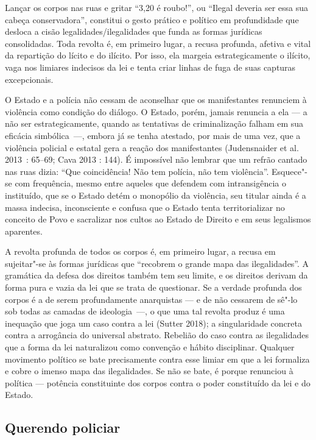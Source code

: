 Lançar os corpos nas ruas e gritar ``3,20 é roubo!'', ou ``Ilegal
deveria ser essa sua cabeça conservadora'', constitui o gesto prático e
político em profundidade que desloca a cisão legalidades/ilegalidades
que funda as formas jurídicas consolidadas. Toda revolta é, em primeiro
lugar, a recusa profunda, afetiva e vital da repartição do lícito e do
ilícito. Por isso, ela margeia estrategicamente o ilícito, vaga nos
limiares indecisos da lei e tenta criar linhas de fuga de suas capturas
excepcionais.

O Estado e a polícia não cessam de aconselhar que os manifestantes
renunciem à violência como condição do diálogo. O Estado, porém, jamais
renuncia a ela --- a não ser estrategicamente, quando as tentativas de
criminalização falham em sua eficácia simbólica~---, embora já se tenha
atestado, por mais de uma vez, que a violência policial e estatal gera a
reação dos manifestantes (Judensnaider et al. 2013~: 65--69; Cava 2013 :
144). É impossível não lembrar que um refrão cantado nas ruas dizia:
``Que coincidência! Não tem polícia, não tem violência''. Esquece"-se com
frequência, mesmo entre aqueles que defendem com intransigência o
instituído, que se o Estado detém o monopólio da violência, seu titular
ainda é a massa indecisa, inconsciente e confusa que o Estado tenta
territorializar no conceito de Povo e sacralizar nos cultos ao Estado de
Direito e em seus legalismos aparentes.

A revolta profunda de todos os corpos é, em primeiro lugar, a recusa em
sujeitar"-se às formas jurídicas que ``recobrem o grande mapa das
ilegalidades''. A gramática da defesa dos direitos também tem seu
limite, e os direitos derivam da forma pura e vazia da lei que se trata
de questionar. Se a verdade profunda dos corpos é a de serem
profundamente anarquistas --- e de não cessarem de sê"-lo sob todas as
camadas de ideologia~---, o que uma tal revolta produz é uma inequação
que joga um caso contra a lei (Sutter 2018); a singularidade concreta
contra a arrogância do universal abstrato. Rebelião do caso contra as
ilegalidades que a forma da lei naturalizou como convenção e hábito
disciplinar. Qualquer movimento político se bate precisamente contra
esse limiar em que a lei formaliza e cobre o imenso mapa das
ilegalidades. Se não se bate, é porque renunciou à política --- potência
constituinte dos corpos contra o poder constituído da lei e do Estado.

\subsection{Querendo policiar}

